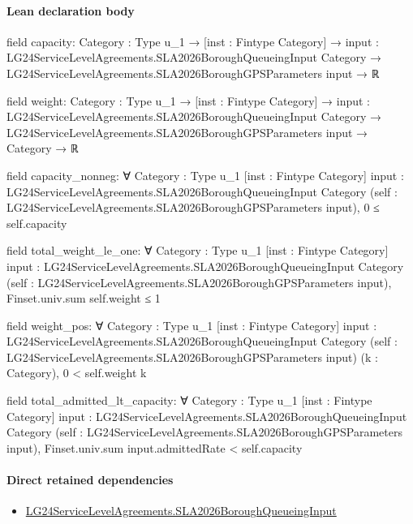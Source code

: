 \documentclass[10pt]{article}
\begin{document}
\paragraph{Lean declaration body}
\begin{ReviewVerbatim}
field capacity:
{Category : Type u_1} →
  [inst : Fintype Category] →
    {input : LG24ServiceLevelAgreements.SLA2026BoroughQueueingInput Category} →
      LG24ServiceLevelAgreements.SLA2026BoroughGPSParameters input → ℝ

field weight:
{Category : Type u_1} →
  [inst : Fintype Category] →
    {input : LG24ServiceLevelAgreements.SLA2026BoroughQueueingInput Category} →
      LG24ServiceLevelAgreements.SLA2026BoroughGPSParameters input → Category → ℝ

field capacity_nonneg:
∀ {Category : Type u_1} [inst : Fintype Category]
  {input : LG24ServiceLevelAgreements.SLA2026BoroughQueueingInput Category}
  (self : LG24ServiceLevelAgreements.SLA2026BoroughGPSParameters input), 0 ≤ self.capacity

field total_weight_le_one:
∀ {Category : Type u_1} [inst : Fintype Category]
  {input : LG24ServiceLevelAgreements.SLA2026BoroughQueueingInput Category}
  (self : LG24ServiceLevelAgreements.SLA2026BoroughGPSParameters input), Finset.univ.sum self.weight ≤ 1

field weight_pos:
∀ {Category : Type u_1} [inst : Fintype Category]
  {input : LG24ServiceLevelAgreements.SLA2026BoroughQueueingInput Category}
  (self : LG24ServiceLevelAgreements.SLA2026BoroughGPSParameters input) (k : Category), 0 < self.weight k

field total_admitted_lt_capacity:
∀ {Category : Type u_1} [inst : Fintype Category]
  {input : LG24ServiceLevelAgreements.SLA2026BoroughQueueingInput Category}
  (self : LG24ServiceLevelAgreements.SLA2026BoroughGPSParameters input),
  Finset.univ.sum input.admittedRate < self.capacity
\end{ReviewVerbatim}

\paragraph{Direct retained dependencies}
\begin{itemize}\raggedright
\item \hyperlink{governing-declaration-3e29dad51cd2861a}{LG24\allowbreak{}Service\allowbreak{}Level\allowbreak{}Agreements.\allowbreak{}SLA2026\allowbreak{}Borough\allowbreak{}Queueing\allowbreak{}Input}
\end{itemize}
\hypertarget{governing-declaration-d97c39780baffce1}{}
\end{document}
